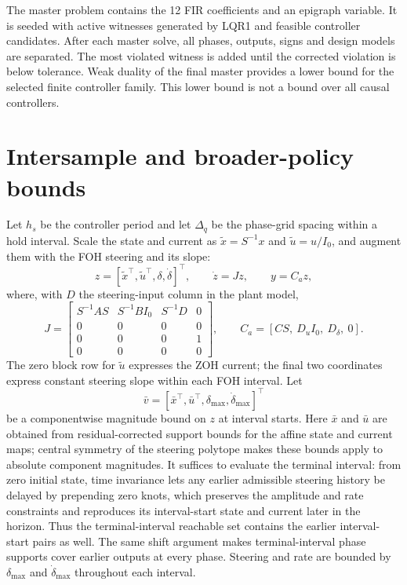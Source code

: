 \documentclass[10pt,a4paper]{article}
\begin{document}
The master problem contains the 12 FIR coefficients and an epigraph variable. It is seeded with active witnesses generated by LQR1 and feasible controller candidates. After each master solve, all phases, outputs, signs and design models are separated. The most violated witness is added until the corrected violation is below tolerance. Weak duality of the final master provides a lower bound for the selected finite controller family. This lower bound is not a bound over all causal controllers.

\section{Intersample and broader-policy bounds}

Let $h_s$ be the controller period and let $\Delta_q$ be the phase-grid spacing within a hold interval. Scale the state and current as $\tilde x=S^{-1}x$ and $\tilde u=u/I_0$, and augment them with the FOH steering and its slope:
\begin{equation}
z=[\tilde x^\top,\tilde u^\top,\delta,\dot\delta]^\top,
\qquad \dot z=Jz,\qquad y=C_a z,
\end{equation}
where, with $D$ the steering-input column in the plant model,
\begin{equation}
J=\begin{bmatrix}
S^{-1}AS&S^{-1}BI_0&S^{-1}D&0\\
0&0&0&0\\
0&0&0&1\\
0&0&0&0
\end{bmatrix},\qquad
C_a=[CS,\ D_uI_0,\ D_\delta,\ 0].
\end{equation}
The zero block row for $\tilde u$ expresses the ZOH current; the final two coordinates express constant steering slope within each FOH interval. Let
\begin{equation}
\bar v=[\bar x^\top,\bar u^\top,\delta_{\max},\dot\delta_{\max}]^\top
\end{equation}
be a componentwise magnitude bound on $z$ at interval starts. Here $\bar x$ and $\bar u$ are obtained from residual-corrected support bounds for the affine state and current maps; central symmetry of the steering polytope makes these bounds apply to absolute component magnitudes. It suffices to evaluate the terminal interval: from zero initial state, time invariance lets any earlier admissible steering history be delayed by prepending zero knots, which preserves the amplitude and rate constraints and reproduces its interval-start state and current later in the horizon. Thus the terminal-interval reachable set contains the earlier interval-start pairs as well. The same shift argument makes terminal-interval phase supports cover earlier outputs at every phase. Steering and rate are bounded by $\delta_{\max}$ and $\dot\delta_{\max}$ throughout each interval.
\end{document}
